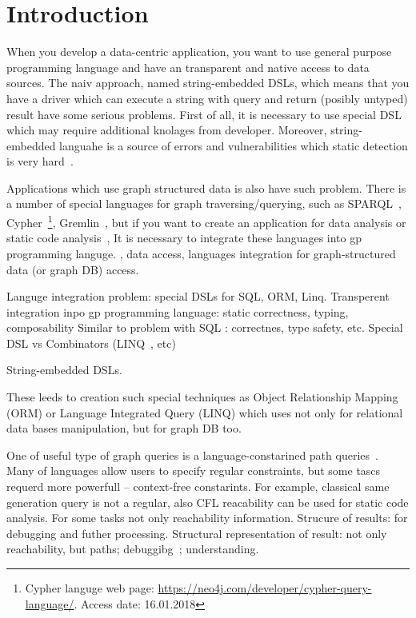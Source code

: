\section{Introduction}

When you develop a data-centric application, you want to use general purpose programming language and have an transparent and native access to data sources.
The naiv approach, named string-embedded DSLs, which means that you have a driver which can execute a string with query and return (posibly untyped) result have some serious problems.
First of all, it is necessary to use special DSL which may require additional knolages from developer.
Moreover, string-embedded languahe is a source of errors and vulnerabilities which static detection is very hard~\cite{stringEmbeddedLanguagesProblem}.  

Applications which use graph structured data is also have such problem. 
There is a number of special languages for graph traversing/querying,
 such as SPARQL~\cite{sparql}, Cypher~\footnote{Cypher languge web page: \url{https://neo4j.com/developer/cypher-query-language/}. Access date: 16.01.2018}, Gremlin~\cite{gremlin},
 but if you want to create an application for data analysis or static code analysis~\cite{!!!}, 
It is necessary to integrate these languages into gp programming languge.
, data access, languages integration for graph-structured data (or graph DB) access.


Languge integration problem: special DSLs for SQL, ORM, Linq.
Transperent integration inpo gp programming language: static correctness, typing, composability
Similar to problem with SQL : correctnes, type safety, etc. Special DSL vs Combinators (LINQ~\cite{LINQ1, LINQ2}, etc)

String-embedded DSLs.


These leeds to creation such special techniques as Object Relationship Mapping (ORM) or Language Integrated Query (LINQ) which uses not only for relational data bases manipulation, but for graph DB too.



One of useful type of graph queries is a language-constarined path queries~\cite{FLCpathProblem}.
Many of languages allow users to specify regular constraints, but some tascs requerd more powerfull -- context-free constarints.
For example, classical same generation query is not a regular, also CFL reacability can be used for static code analysis.
For some tasks not only reachability information. Strucure of results: for debugging and futher processing.
Structural representation of result: not only reachability, but paths; debuggibg~\cite{structForDebugging}; understanding.


